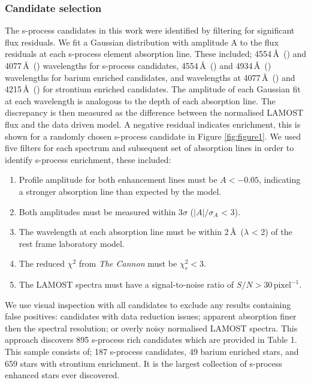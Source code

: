 \documentclass[a4paper,fleqn,usenatbib]{mnras}
\begin{document}
\subsubsection{Candidate selection} \label{sec:cand}
The s-process candidates in this work were identified by filtering for significant flux residuals. We fit a Gaussian distribution with amplitude A to the flux residuals at each s-process element absorption line. These included; 4554\,\AA\ () and 4077\,\AA\ () wavelengths for s-process candidates, 4554\,\AA\ () and 4934\,\AA\ () wavelengths for barium enriched candidates, and wavelengths at 4077\,\AA\ () and 4215\,\AA\ () for strontium enriched candidates. The amplitude of each Gaussian fit at each wavelength is analogous to the depth of each absorption line. The discrepancy is then measured as the difference between the normalised LAMOST flux and the data driven model. A negative residual indicates enrichment, this is shown for a randomly chosen s-process candidate in Figure \ref{fig:figure1}.
We used five filters for each spectrum and subsequent set of absorption lines in order to identify s-process enrichment, these included:

\renewcommand\labelenumi{(\roman{enumi})}
\renewcommand\theenumi\labelenumi

\begin{enumerate} 
\item Profile amplitude for both enhancement lines must be $A < -0.05$, indicating a stronger absorption line than expected by the model.
\item Both amplitudes must be measured within 3$\sigma$ ($|A|/\sigma _A$ < 3).
\item The wavelength at each absorption line must be within 2\,\AA\ ($\lambda$ < 2) of the rest frame laboratory model.
\item The reduced $\chi^2$ from \emph{The Cannon} must be $\chi_r^2 < 3$.
\item The LAMOST spectra must have a signal-to-noise ratio of $S/N > 30\,\textrm{pixel}^{-1}$.
\end{enumerate}
We use visual inspection with all candidates to exclude any results containing false positives: candidates with data reduction issues; apparent absorption finer then the spectral resolution; or overly noisy normalised LAMOST spectra. This approach discovers 895 s-process rich candidates which are provided in Table 1. This sample consists of; 187 s-process candidates, 49 barium enriched stars, and 659 stars with strontium enrichment. It is the largest collection of s-process enhanced stars ever discovered.
\end{document}
